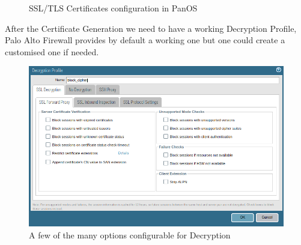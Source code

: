 \documentclass[status=normal,cover=tesi,language=en]{gmeepd}
\begin{document}
\begin{figure}[!hb]
\centering
 \hspace{0.5cm}
 \caption{SSL/TLS Certificates configuration in PanOS}\label{Certificates}
\end{figure}

\pagebreak

After the Certificate Generation we need to have a working Decryption Profile, Palo Alto Firewall provides by default a working one but one could create a customised one if needed.

\begin{figure}[!hb]
    \centering
     \includegraphics[width=13cm]{img/decryption_options.png}
    	\caption{A few of the many options configurable for Decryption}\label{Decryption Options}
\end{figure}
\end{document}
